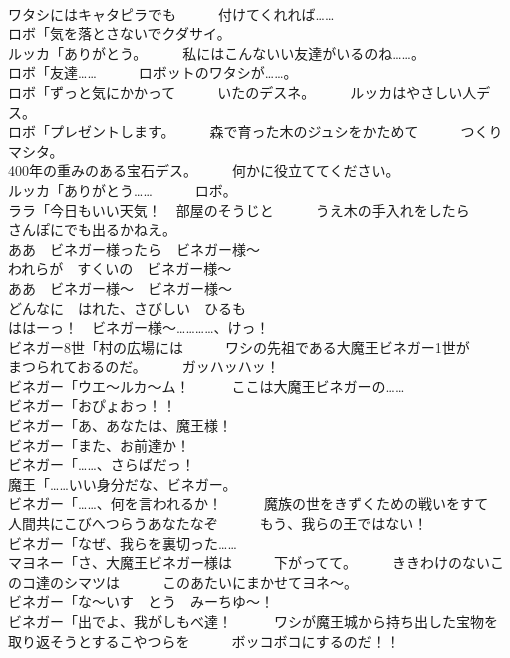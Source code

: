 \documentclass[8pt]{extreport}
\begin{document}
\begin{CJK}{UTF8}{min}
\\	ワタシにはキャタピラでも　　　付けてくれれば……	
\\	ロボ「気を落とさないでクダサイ。	
\\	ルッカ「ありがとう。　　　私にはこんないい友達がいるのね……。	
\\	ロボ「友達……　　　ロボットのワタシが……。	
\\	ロボ「ずっと気にかかって　　　いたのデスネ。　　　ルッカはやさしい人デス。	
\\	ロボ「プレゼントします。　　　森で育った木のジュシをかためて　　　つくりマシタ。	
\\	400年の重みのある宝石デス。　　　何かに役立ててください。	
\\	ルッカ「ありがとう……　　　ロボ。	
\\	ララ「今日もいい天気！　部屋のそうじと　　　うえ木の手入れをしたら　　　さんぽにでも出るかねえ。	
\\	ああ　ビネガー様ったら　ビネガー様～
\\	われらが　すくいの　ビネガー様～
\\	ああ　ビネガー様～　ビネガー様～
\\	どんなに　はれた、さびしい　ひるも	
\\	ははーっ！　ビネガー様～…………、けっ！	
\\	ビネガー8世「村の広場には　　　ワシの先祖である大魔王ビネガー1世が　　　まつられておるのだ。　　　ガッハッハッ！	
\\	ビネガー「ウエ～ルカ～ム！　　　ここは大魔王ビネガーの……	
\\	ビネガー「おぴょおっ！！	
\\	ビネガー「あ、あなたは、魔王様！	
\\	ビネガー「また、お前達か！	
\\	ビネガー「……、さらばだっ！	
\\	魔王「……いい身分だな、ビネガー。	
\\	ビネガー「……、何を言われるか！　　　魔族の世をきずくための戦いをすて　　　人間共にこびへつらうあなたなぞ　　　もう、我らの王ではない！	
\\	ビネガー「なぜ、我らを裏切った……	
\\	マヨネー「さ、大魔王ビネガー様は　　　下がってて。　　　ききわけのないこのコ達のシマツは　　　このあたいにまかせてヨネ～。	
\\	ビネガー「な～いす　とう　みーちゆ～！	
\\	ビネガー「出でよ、我がしもべ達！　　　ワシが魔王城から持ち出した宝物を　　　取り返そうとするこやつらを　　　ボッコボコにするのだ！！	

\end{CJK}
\end{document}
